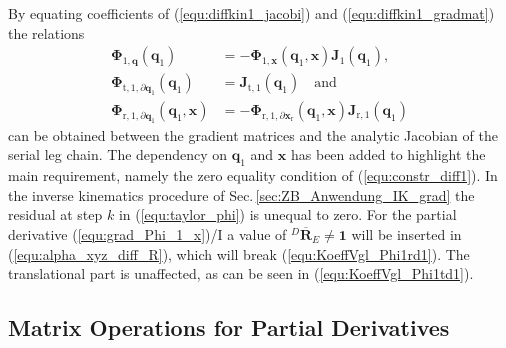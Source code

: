 \documentclass[robotics,article,submit,moreauthors,pdftex]{Definitions/mdpi}
\newcommand{\bm}[1]{\boldsymbol{#1}}
\newcommand{\rotmato}[2]{{{ }^{#1}\boldsymbol{\overline{R}}}_{#2}}
\begin{document}
%
By equating coefficients of (\ref{equ:diffkin1_jacobi}) and (\ref{equ:diffkin1_gradmat}) the relations
%
\begin{align}
\bm{\Phi}_{1,\bm{q}}(\bm{q}_1)
&=
-\bm{\Phi}_{1,\bm{x}}(\bm{q}_1,\bm{x})
\bm{J}_1(\bm{q}_1),
\label{equ:KoeffVgl_Phi1d1}
\\
\bm{\Phi}_{\mathrm{t},1,\partial\bm{q}_1}(\bm{q}_1)
&=
\bm{J}_{\mathrm{t},1}(\bm{q}_1)\quad\mathrm{and}
\label{equ:KoeffVgl_Phi1td1}
\\
\bm{\Phi}_{\mathrm{r},1,\partial\bm{q}_1}(\bm{q}_1,\bm{x})
&=
-\bm{\Phi}_{\mathrm{r},1,\partial\bm{x}_\mathrm{r}}(\bm{q}_1,\bm{x}) \bm{J}_{\mathrm{r},1}(\bm{q}_1)
\label{equ:KoeffVgl_Phi1rd1}
\end{align}
%
can be obtained between the gradient matrices and the analytic Jacobian of the serial leg chain.
The dependency on $\bm{q}_1$ and $\bm{x}$ has been added to highlight the main requirement, namely the zero equality condition of (\ref{equ:constr_diff1}).
In the inverse kinematics procedure of Sec.\,\ref{sec:ZB_Anwendung_IK_grad} the residual at step $k$ in (\ref{equ:taylor_phi}) is unequal to zero.
For the partial derivative (\ref{equ:grad_Phi_1_x})/I a value of $\rotmato{D}{E} \ne \bm{1}$ will be inserted in (\ref{equ:alpha_xyz_diff_R}), which will break (\ref{equ:KoeffVgl_Phi1rd1}).
The translational part is unaffected, as can be seen in (\ref{equ:KoeffVgl_Phi1td1}).

\subsection{Matrix Operations for Partial Derivatives}
\label{sec:appendix_gradient_matrix}
\end{document}
